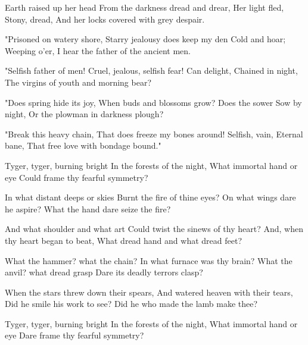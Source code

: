 \begin{poem}

\begin{stanza}
Earth raised up her head
From the darkness dread and drear,
Her light fled,
Stony, dread,
And her locks covered with grey despair.
\end{stanza}
\begin{stanza}
"Prisoned on watery shore,
Starry jealousy does keep my den
Cold and hoar;
Weeping o'er,
I hear the father of the ancient men.
\end{stanza}
\begin{stanza}
"Selfish father of men!
Cruel, jealous, selfish fear!
Can delight,
Chained in night,
The virgins of youth and morning bear?
\end{stanza}
\begin{stanza}
"Does spring hide its joy,
When buds and blossoms grow?
Does the sower
Sow by night,
Or the plowman in darkness plough?
\end{stanza}
\begin{stanza}
"Break this heavy chain,
That does freeze my bones around!
Selfish, vain,
Eternal bane,
That free love with bondage bound."
\end{stanza}

\end{poem}

\begin{poem}

\begin{stanza}
Tyger, tyger, burning bright\verseline
In the forests of the night,\verseline
What immortal hand or eye\verseline
Could frame thy fearful symmetry?
\end{stanza}
\begin{stanza}
\verseindent In what distant deeps or skies\verseline
Burnt the fire of thine eyes?\verseline
On what wings dare he aspire?\verseline
What the hand dare seize the fire?
\end{stanza}
\begin{stanza}
\verseindent And what shoulder and what art\verseline
Could twist the sinews of thy heart?\verseline
And, when thy heart began to beat,\verseline
What dread hand and what dread feet?
\end{stanza}
\begin{stanza}
\verseindent What the hammer? what the chain?\verseline
In what furnace was thy brain?\verseline
What the anvil? what dread grasp\verseline
Dare its deadly terrors clasp?
\end{stanza}
\begin{stanza}
\verseindent When the stars threw down their spears,\verseline
And watered heaven with their tears,\verseline
Did he smile his work to see?\verseline
Did he who made the lamb make thee?
\end{stanza}
\begin{stanza}
\verseindent Tyger, tyger, burning bright\verseline
In the forests of the night,\verseline
What immortal hand or eye\verseline
Dare frame thy fearful symmetry?
\end{stanza}

\end{poem}